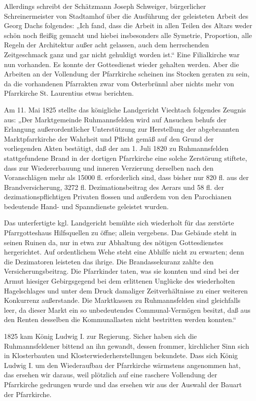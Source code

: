 \documentclass[12pt,a4paper]{book}
\begin{document}
Allerdings schreibt der Schätzmann Joseph Schweiger, bürgerlicher
Schreinermeister von Stadtamhof über die Ausführung der geleisteten Arbeit des
Georg Dachs folgendes: „Ich fand, dass die Arbeit in allen Teilen des Altars
weder schön noch fleißig gemacht und hiebei insbesonders alle Symetrie,
Proportion, alle Regeln der Architektur außer acht gelassen, auch dem
herrschenden Zeitgeschmack ganz und gar nicht gehuldigt worden ist.“ Eine
Filialkirche war nun vorhanden. Es konnte der Gottesdienst wieder gehalten
werden. Aber die Arbeiten an der Vollendung der Pfarrkirche scheinen ins Stocken
geraten zu sein, da die vorhandenen Pfarrakten zwar vom Osterbrünnl aber nichts
mehr von Pfarrkirche St. Laurentius etwas berichten.

Am 11. Mai 1825 stellte das königliche Landgericht Viechtach folgendes Zeugnis
aus: „Der Marktgemeinde Ruhmannsfelden wird auf Ansuchen behufs der Erlangung
außerordentlicher Unterstützung zur Herstellung der abgebrannten
Marktpfarrkirche der Wahrheit und Pflicht gemäß auf den Grund der vorliegenden
Akten bestätigt, daß der am 1. Juli 1820 zu Ruhmannsfelden stattgefundene Brand
in der dortigen Pfarrkirche eine solche Zerstörung stiftete, dass zur
Wiedererbauung und inneren Verzierung derselben nach den Voranschlägen mehr als
15000 fl. erforderlich sind, dass bisher nur 820 fl. aus der Brandversicherung,
3272 fl. Dezimationsbeitrag des Aerars und 58 fl. der dezimationspflichtigen
Privaten flossen und außerdem von den Parochianen bedeutende Hand- und
Spanndienste geleistet wurden.

Das unterfertigte kgl. Landgericht bemühte sich wiederholt für das zerstörte
Pfarrgotteshaus Hilfsquellen zu öffne; allein vergebens. Das Gebäude steht in
seinen Ruinen da, nur in etwa zur Abhaltung des nötigen Gottesdienstes
hergerichtet. Auf ordentlichem Wehe steht eine Abhilfe nicht zu erwarten; denn
die Dezimatoren leisteten das ihrige. Die Brandassekuranz zahlte den
Versicherungsbeitrag. Die Pfarrkinder taten, was sie konnten und sind bei der
Armut hiesiger Gebirgsgegend bei dem erlittenen Unglücke des wiederholten
Hagelschlages und unter dem Druck damaliger Zeitverhältnisse zu einer weiteren
Konkurrenz außerstande. Die Marktkassen zu Ruhmannsfelden sind gleichfalls leer,
da dieser Markt ein so unbedeutendes Communal-Vermögen besitzt, daß aus den
Renten desselben die Kommunallasten nicht bestritten werden konnten.“

1825 kam König Ludwig I. zur Regierung. Sicher haben sich die Ruhmannsfeldener
bittend an ihn gewandt, dessen frommer, kirchlicher Sinn sich in Klosterbauten
und Klosterwiederherstellungen bekundete. Dass sich König Ludwig I. um den
Wiederaufbau der Pfarrkirche wärmstens angenommen hat, das ersehen wir daraus,
weil plötzlich auf eine raschere Vollendung der Pfarrkirche gedrungen wurde und
das ersehen wir aus der Auswahl der Bauart der Pfarrkirche.
\end{document}
